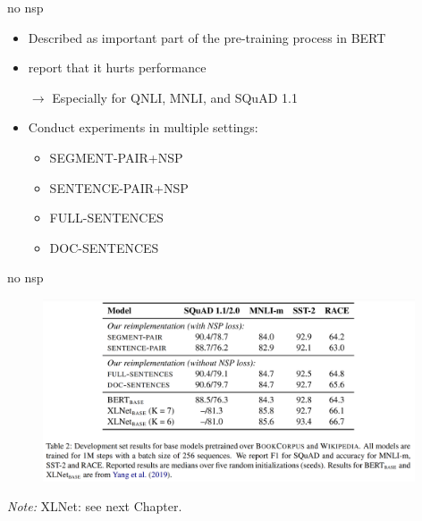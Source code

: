 
\begin{frame}{no nsp}

\vfill

	\begin{itemize}
		\item Described as important part of the pre-training process in BERT
		\item {} report that it hurts performance
		\item[$\to$] Especially for QNLI, MNLI, and SQuAD 1.1
		\item Conduct experiments in multiple settings: 
			\begin{itemize}
				\item SEGMENT-PAIR+NSP
				\item SENTENCE-PAIR+NSP
				\item FULL-SENTENCES
				\item DOC-SENTENCES
			\end{itemize}
	\end{itemize}
	
\vfill

\end{frame}

\begin{frame}{no nsp}

\vfill

\begin{figure}
\centering
\includegraphics[width = 11cm]{figure/roberta-nsp.png}\\ 
\end{figure}

\vfill

\scriptsize
\textit{Note:} XLNet: see next Chapter.

\end{frame}


